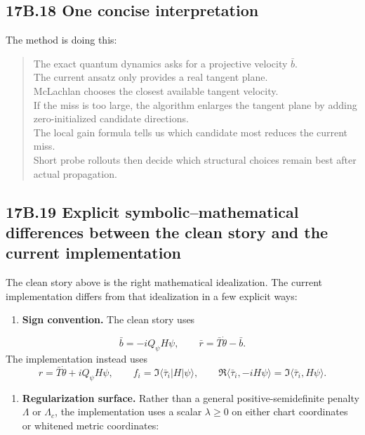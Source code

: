\documentclass[11pt]{article}
\begin{document}
\subsection*{17B.18 One concise interpretation}


The method is doing this:

\begin{quote}
The exact quantum dynamics asks for a projective velocity $\bar b$. \\
The current ansatz only provides a real tangent plane. \\
McLachlan chooses the closest available tangent velocity. \\
If the miss is too large, the algorithm enlarges the tangent plane by adding zero-initialized candidate directions. \\
The local gain formula tells us which candidate most reduces the current miss. \\
Short probe rollouts then decide which structural choices remain best after actual propagation.
\end{quote}


\subsection*{17B.19 Explicit symbolic--mathematical differences between the clean story and the current implementation}


The clean story above is the right mathematical idealization. The current implementation differs from that idealization in a few explicit ways:

\begin{enumerate}
\item \textbf{Sign convention.} The clean story uses
\end{enumerate}

\[
   \bar b=-iQ_\psi H\psi,
   \qquad
   \bar r=\bar T\dot\theta-\bar b.
\]
   The implementation instead uses
\[
   r=\bar T\dot\theta+iQ_\psi H\psi,
   \qquad
   f_i=\Im\langle \bar\tau_i|H|\psi\rangle,
   \qquad
   \Re\langle \bar\tau_i,-iH\psi\rangle=\Im\langle \bar\tau_i,H\psi\rangle.
\]

\begin{enumerate}
\item \textbf{Regularization surface.} Rather than a general positive-semidefinite penalty $\Lambda$ or $\Lambda_c$, the implementation uses a scalar $\lambda\ge 0$ on either chart coordinates or whitened metric coordinates:
\end{enumerate}
\end{document}
